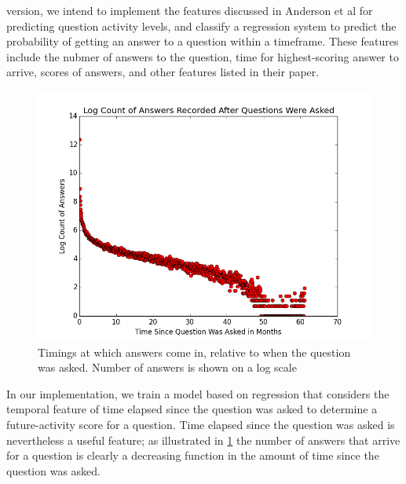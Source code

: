 \documentclass[a4paper]{article}
\begin{document}

version, we intend to implement the features discussed in Anderson et al \cite{anderson2012} for predicting question activity levels, and classify a regression system to predict the probability of getting an answer to a question within a timeframe. These features include the nubmer of answers to the question, time for highest-scoring answer to arrive, scores of answers, and other features listed in their paper.

\begin{figure}[ht]
\centering
\includegraphics[width=\columnwidth]{answer-timing}
\caption{Timings at which answers come in, relative to when the question was asked. Number of answers is shown on a log scale}
\label{fig:answer-timing}
\end{figure}

In our implementation, we train a model based on regression that considers the temporal feature of time elapsed since the question was asked to determine a future-activity score for a question. Time elapsed since the question was asked is nevertheless a useful feature; as illustrated in \ref{fig:answer-timing} the number of answers that arrive for a question is clearly a decreasing function in the amount of time since the question was asked.
\end{document}
